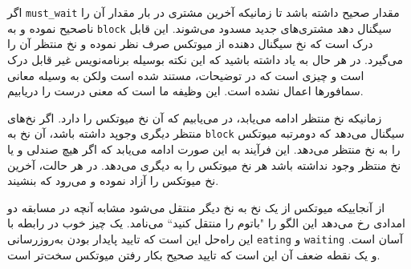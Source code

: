 \documentclass{book}
\newcommand{\clearemptydoublepage}{\newpage\cleardoublepage}
\begin{document}
    اگر {\tt must\_wait} مقدار صحیح داشته باشد تا زمانیکه آخرین مشتری در بار مقدار آن را ناصحیح نموده و به  {\tt block} سیگنال دهد مشتری‌های جدید 
    مسدود می‌شوند. این قابل درک است که نخ سیگنال دهنده از میوتکس صرف نظر نموده و نخ منتظر آن را می‌گیرد. در هر حال  به یاد داشته باشید که 
    این نکته بوسیله برنامه‌نویس غیر قابل درک است و چیزی است که در توضیحات، مستند شده است 
    ولکن به وسیله معانی سمافورها اعمال نشده است. این وظیفه ما است که معنی درست را دریابیم.

    زمانیکه نخ منتظر ادامه می‌یابد، در می‌یابیم که آن نخ میوتکس را دارد. اگر نخ‌های منتظر دیگری وجوپد داشته باشد، آن نخ به  {\tt block} سیگنال می‌دهد که 
    دومرتبه میوتکس را به نخ منتظر می‌دهد. این فرآیند به این صورت ادامه می‌یابد که  اگر هیچ صندلی و یا نخ منتظر وجود نداشته باشد هر نخ میوتکس را
    به دیگری می‌دهد. در هر حالت، آخرین نخ میوتکس را آزاد نموده و می‌رود که بنشیند. 
    

    از آنجاییکه میوتکس از یک نخ به نخ دیگر منتقل می‌شود مشابه آنچه در مسابقه دو امدادی رخ می‌دهد 
    این الگو را "باتوم را منتقل کنید‍‍`` می‌نامد.
    یک چیز خوب در رابطه با این راه‌حل این است که تایید پایدار بودن به‌روزرسانی  {\tt eating} و {\tt waiting} آسان است. و  یک نقطه ضعف آن 
    این است که تایید صحیح بکار رفتن میوتکس سخت‌تر است. 

\end{document}
